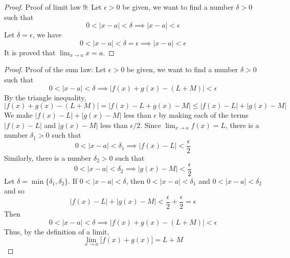 \begin{proof}
    Proof of limit law 9:
    Let \(\epsilon>0\) be given,
    we want to find a number \(\delta>0\) such
    that \[0<|x-a|<\delta\implies|x-a|<\epsilon\]
    Let \(\delta=\epsilon\),
    we have
    \[0<|x-a|<\delta=\epsilon\implies|x-a|<\epsilon\]
    It is proved that \(\displaystyle{\lim_{x\to a}x=a}\).
\end{proof}
\begin{proof}
    Proof of the sum law:
    Let \(\epsilon>0\) be given,
    we want to find a number \(\delta>0\) such that
    \[0<|x-a|<\delta\implies|f(x)+g(x)-(L+M)|<\epsilon\]
    By the triangle inequality,
    \[|f(x)+g(x)-(L+M)|=|f(x)-L+g(x)-M|\leq|f(x)-L|+|g(x)-M|\]
    We make \(|f(x)-L|+|g(x)-M|\) less than \(\epsilon\) by making each of the
    terms \(|f(x)-L|\) and \(|g(x)-M|\) less than \(\epsilon/2\).
    Since \(\displaystyle{\lim_{x\to a}f(x)=L}\),
    there is a number \(\delta_1>0\) such that
    \[0<|x-a|<\delta_1\implies|f(x)-L|<\frac{\epsilon}{2}\]
    Similarly,
    there is a number \(\delta_2>0\) such that
    \[0<|x-a|<\delta_2\implies|g(x)-M|<\frac{\epsilon}{2}\]
    Let \(\delta=\min\{\delta_1,\delta_2\}\).
    If \(0<|x-a|<\delta\),
    then \(0<|x-a|<\delta_1\) and \(0<|x-a|<\delta_2\)
    and so
    \[|f(x)-L|+|g(x)-M|<\frac{\epsilon}{2}+\frac{\epsilon}{2}=\epsilon\]
    Then
    \[0<|x-a|<\delta\implies|f(x)+g(x)-(L+M)|<\epsilon\]
    Thus,
    by the definition of a limit,
    \[\lim_{x\to a}\bigl[f(x)+g(x)\bigr]=L+M\]
\end{proof}
